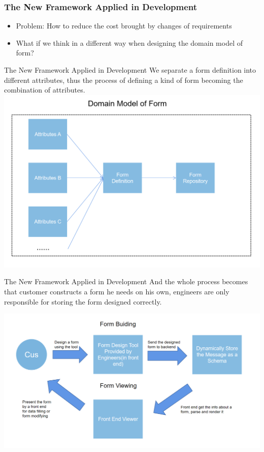 \documentclass{beamer}
\begin{document}
\begin{frame}
\frametitle{The New Framework Applied in Development}
\begin{itemize}
    \item <1-> Problem: How to reduce the cost brought by changes of requirements
        
    \item <2-> What if we think in a different way when designing the domain model of form?
    
\end{itemize}
\end{frame}

\begin{frame}{The New Framework Applied in Development}
We separate a form definition into different attributes, thus the process of defining a kind of form becoming the combination of attributes.
\includegraphics[width=0.9\linewidth]{domainform2.png}
\end{frame}

\begin{frame}{The New Framework Applied in Development}
And the whole process becomes that customer constructs a form he needs on his own, engineers are only responsible for storing the form designed correctly.
    
\includegraphics[width=0.9\linewidth]{framework3.png}
\end{frame}
\end{document}
